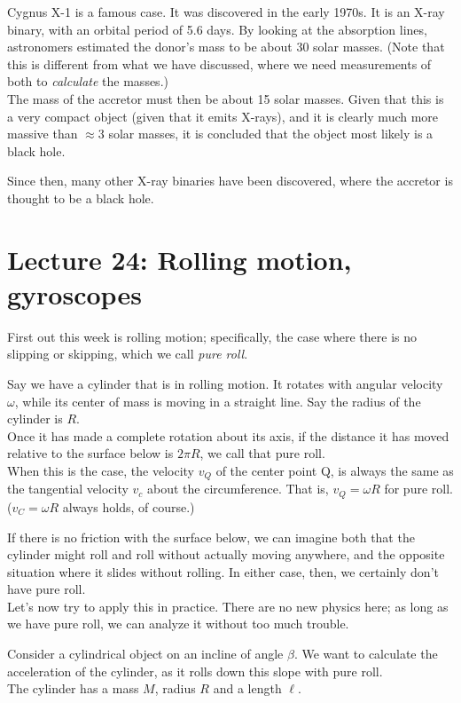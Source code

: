 Cygnus X-1 is a famous case. It was discovered in the early 1970s. It is an X-ray binary, with an orbital period of 5.6 days. By looking at the absorption lines, astronomers estimated the donor's mass to be about 30 solar masses. (Note that this is different from what we have discussed, where we need measurements of both to \emph{calculate} the masses.)\\
The mass of the accretor must then be about 15 solar masses. Given that this is a very compact object (given that it emits X-rays), and it is clearly much more massive than $\approx 3$ solar masses, it is concluded that the object most likely is a black hole.

Since then, many other X-ray binaries have been discovered, where the accretor is thought to be a black hole.

\section{Lecture 24: Rolling motion, gyroscopes}

First out this week is rolling motion; specifically, the case where there is no slipping or skipping, which we call \emph{pure roll}.

Say we have a cylinder that is in rolling motion. It rotates with angular velocity $\omega$, while its center of mass is moving in a straight line. Say the radius of the cylinder is $R$.\\
Once it has made a complete rotation about its axis, if the distance it has moved relative to the surface below is $2 \pi R$, we call that pure roll.\\
When this is the case, the velocity $v_Q$ of the center point Q, is always the same as the tangential velocity $v_c$ about the circumference. That is, $v_Q = \omega R$ for pure roll. ($v_C = \omega R$ always holds, of course.)

If there is no friction with the surface below, we can imagine both that the cylinder might roll and roll without actually moving anywhere, and the opposite situation where it slides without rolling. In either case, then, we certainly don't have pure roll.\\
Let's now try to apply this in practice. There are no new physics here; as long as we have pure roll, we can analyze it without too much trouble.

Consider a cylindrical object on an incline of angle $\beta$. We want to calculate the acceleration of the cylinder, as it rolls down this slope with pure roll.\\
The cylinder has a mass $M$, radius $R$ and a length $\ell$.

